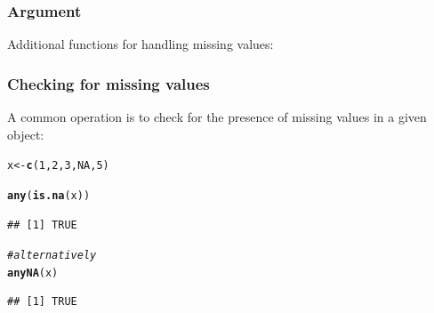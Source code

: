 \documentclass[12pt]{beamer}\usepackage[]{graphicx}\usepackage[]{color}
\makeatletter
\newcommand{\hlnum}[1]{\textcolor[rgb]{0.686,0.059,0.569}{#1}}%
\newcommand{\hlcom}[1]{\textcolor[rgb]{0.678,0.584,0.686}{\textit{#1}}}%
\newcommand{\hlstd}[1]{\textcolor[rgb]{0.345,0.345,0.345}{#1}}%
\newcommand{\hlkwb}[1]{\textcolor[rgb]{0.69,0.353,0.396}{#1}}%
\newcommand{\hlkwd}[1]{\textcolor[rgb]{0.737,0.353,0.396}{\textbf{#1}}}%
\newenvironment{kframe}{%
 \def\at@end@of@kframe{}%
 \ifinner\ifhmode%
  \def\at@end@of@kframe{\end{minipage}}%
  \begin{minipage}{\columnwidth}%
 \fi\fi%
 \def\FrameCommand##1{\hskip\@totalleftmargin \hskip-\fboxsep
 \colorbox{shadecolor}{##1}\hskip-\fboxsep
     \hskip-\linewidth \hskip-\@totalleftmargin \hskip\columnwidth}%
 \MakeFramed {\advance\hsize-\width
   \@totalleftmargin\z@ \linewidth\hsize
   \@setminipage}}%
 {\par\unskip\endMakeFramed%
 \at@end@of@kframe}
\newenvironment{knitrout}{}{} %
\makeatother
\begin{document}

\begin{frame}
\begin{center}
\Huge{}
\end{center}
\end{frame}


\begin{frame}
\frametitle{Argument }

Additional functions for handling missing values:
\bi
  \item {}
  \item {}
  \item {}
  \item {}
  \item {}
  \item {}
\ei

\end{frame}


\begin{frame}[fragile]
\frametitle{Checking for missing values}

A common operation is to check for the presence of missing values in a given object:
\begin{knitrout}\footnotesize
{}\color{fgcolor}\begin{kframe}
\begin{alltt}
\hlstd{x} \hlkwb{<-} \hlkwd{c}\hlstd{(}\hlnum{1}\hlstd{,} \hlnum{2}\hlstd{,} \hlnum{3}\hlstd{,} \hlnum{NA}\hlstd{,} \hlnum{5}\hlstd{)}

\hlkwd{any}\hlstd{(}\hlkwd{is.na}\hlstd{(x))}
\end{alltt}
\begin{verbatim}
## [1] TRUE
\end{verbatim}
\begin{alltt}
\hlcom{# alternatively}
\hlkwd{anyNA}\hlstd{(x)}
\end{alltt}
\begin{verbatim}
## [1] TRUE
\end{verbatim}
\end{kframe}
\end{knitrout}

\end{frame}
\end{document}
